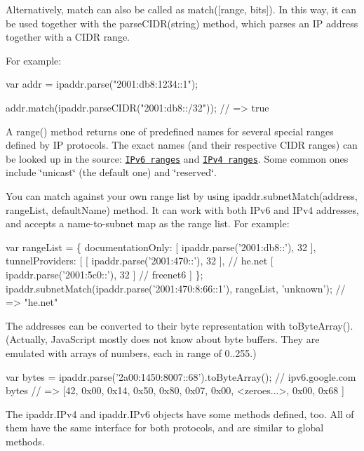 Alternatively, {\ttfamily match} can also be called as {\ttfamily match(\mbox{[}range, bits\mbox{]})}. In this way, it can be used together with the {\ttfamily parse\+C\+I\+D\+R(string)} method, which parses an IP address together with a C\+I\+DR range.

For example\+:


\begin{DoxyCode}
var addr = ipaddr.parse("2001:db8:1234::1");

addr.match(ipaddr.parseCIDR("2001:db8::/32")); // => true
\end{DoxyCode}


A {\ttfamily range()} method returns one of predefined names for several special ranges defined by IP protocols. The exact names (and their respective C\+I\+DR ranges) can be looked up in the source\+: \href{https://github.com/whitequark/ipaddr.js/blob/master/src/ipaddr.coffee#L186}{\tt I\+Pv6 ranges} and \href{https://github.com/whitequark/ipaddr.js/blob/master/src/ipaddr.coffee#L71}{\tt I\+Pv4 ranges}. Some common ones include {\ttfamily \char`\"{}unicast\char`\"{}} (the default one) and {\ttfamily \char`\"{}reserved\char`\"{}}.

You can match against your own range list by using {\ttfamily ipaddr.\+subnet\+Match(address, range\+List, default\+Name)} method. It can work with both I\+Pv6 and I\+Pv4 addresses, and accepts a name-\/to-\/subnet map as the range list. For example\+:


\begin{DoxyCode}
var rangeList = \{
  documentationOnly: [ ipaddr.parse('2001:db8::'), 32 ],
  tunnelProviders: [
    [ ipaddr.parse('2001:470::'), 32 ], // he.net
    [ ipaddr.parse('2001:5c0::'), 32 ]  // freenet6
  ]
\};
ipaddr.subnetMatch(ipaddr.parse('2001:470:8:66::1'), rangeList, 'unknown'); // => "he.net"
\end{DoxyCode}


The addresses can be converted to their byte representation with {\ttfamily to\+Byte\+Array()}. (Actually, Java\+Script mostly does not know about byte buffers. They are emulated with arrays of numbers, each in range of 0..255.)


\begin{DoxyCode}
var bytes = ipaddr.parse('2a00:1450:8007::68').toByteArray(); // ipv6.google.com
bytes // => [42, 0x00, 0x14, 0x50, 0x80, 0x07, 0x00, <zeroes...>, 0x00, 0x68 ]
\end{DoxyCode}


The {\ttfamily ipaddr.\+I\+Pv4} and {\ttfamily ipaddr.\+I\+Pv6} objects have some methods defined, too. All of them have the same interface for both protocols, and are similar to global methods.

